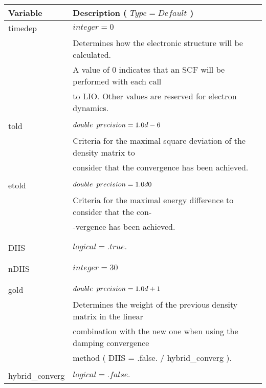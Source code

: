     \begin{table}
        \begin{center}
        \begin{tabular}{l l}

           \toprule
           \textbf{Variable}    & \textbf{Description} ( $ Type = Default $ ) \\
           \midrule

           timedep & $ integer = 0 $ \\
           & Determines how the electronic structure will be calculated.\\
           & A value of 0 indicates that an SCF will be performed with each call \\
           & to LIO. Other values are reserved for electron dynamics. \\ \\
           told  & $ double \hspace{0.5em} precision = 1.0d-6 $ \\
           & Criteria for the maximal square deviation of the density matrix to \\
           & consider that the convergence has been achieved. \\
           \\
           etold & $ double \hspace{0.5em} precision = 1.0d0 $ \\
           & Criteria for the maximal energy difference to consider that the con-\\
           & -vergence has been achieved. \\
           & \\
           \\
           DIIS  & $ logical = .true. $\\
           & \\
           \\
           nDIIS & $ integer = 30 $ \\
           & \\
           \\
           gold & $ double \hspace{0.5em} precision = 1.0d+1 $\\
           & Determines the weight of the previous density matrix in the linear \\
           & combination with the new one when using the damping convergence \\
           & method ( DIIS = .false. / hybrid\_converg ).\\
           \\
           hybrid\_converg & $ logical = .false. $\\

\end{tabular}
\end{center}
\end{table}

